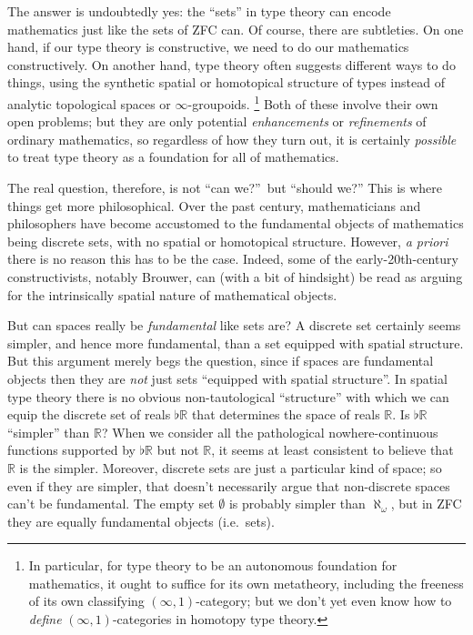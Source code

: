 \documentclass[12pt]{article}
\def\oo{\ensuremath{\infty}}
\def\io{\ensuremath{(\oo,1)}}
\def\R{\mathbb{R}}
\numberwithin{equation}{section}
\begin{document}
The answer is undoubtedly yes: the ``sets'' in type theory can encode mathematics just like the sets of ZFC can.
Of course, there are subtleties.
On one hand, if our type theory is constructive, %
we need to do our mathematics constructively. %
On another hand, type theory often suggests different ways to do things, using the synthetic spatial or homotopical structure of types instead of analytic topological spaces or $\oo$-groupoids.%
\footnote{In particular, for type theory to be an autonomous foundation for mathematics, it ought to suffice for its own metatheory, including the freeness of its own classifying $\io$-category;
but we don't yet even know how to \emph{define} $\io$-categories in homotopy type theory.}
Both of these involve their own open problems; but they are only potential \emph{enhancements} or \emph{refinements} of ordinary mathematics, so regardless of how they turn out, it is certainly \emph{possible} to treat type theory as a foundation for all of mathematics.

The real question, therefore, is not ``can we?''\ but ``should we?''
This is where things get more philosophical.
Over the past century, mathematicians and philosophers have become accustomed to the fundamental objects of mathematics being discrete sets, with no spatial or homotopical structure.
However, \textit{a priori} there is no reason this has to be the case.
Indeed, some of the early-20th-century constructivists, notably Brouwer, can (with a bit of hindsight) be read as arguing for the intrinsically spatial nature of mathematical objects.

But can spaces really be \emph{fundamental} like sets are?
A discrete set certainly seems simpler, and hence more fundamental, than a set equipped with spatial structure.
But this argument merely begs the question, since if spaces are fundamental objects then they are \emph{not} just sets ``equipped with spatial structure''.
In spatial type theory there is no obvious non-tautological ``structure'' with which we can equip the discrete set of reals $\flat\R$ that determines the space of reals $\R$.
Is $\flat\R$ ``simpler'' than $\R$?
When we consider all the pathological nowhere-continuous functions supported by $\flat\R$ but not $\R$, it seems at least consistent to believe that $\R$ is the simpler.
Moreover, discrete sets are just a particular kind of space; so even if they are simpler, that doesn't necessarily argue that non-discrete spaces can't be fundamental.
The empty set $\emptyset$ is probably simpler than $\aleph_\omega$, but in ZFC they are equally fundamental objects (i.e.\ sets).
\end{document}

